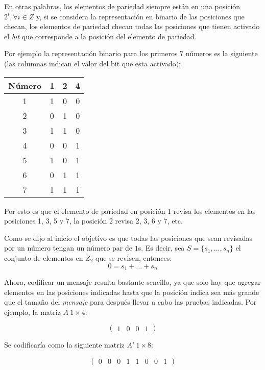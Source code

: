 \documentclass{article}
\begin{document}
En otras palabras, los elementos de pariedad siempre están en una posición $2^i, \forall i \in Z$ y, si se considera la representación en binario de las posiciones que checan, los elementos de pariedad checan todas las posiciones que tienen activado el \textit{bit} que corresponde a la posición del elemento de pariedad.

Por ejemplo la representación binario para los primeros 7 números es la siguiente (las columnas indican el valor del bit que esta activado):

\begin{center}
    \begin{tabular}{|c||c|c|c|}
        \hline
        Número & 1 & 2 & 4 \\
        \hline
        1 & 1 & 0 & 0 \\
        2 & 0 & 1 & 0 \\
        3 & 1 & 1 & 0 \\
        4 & 0 & 0 & 1 \\
        5 & 1 & 0 & 1 \\
        6 & 0 & 1 & 1 \\
        7 & 1 & 1 & 1 \\
        \hline
    \end{tabular}
\end{center}

Por esto es que el elemento de pariedad en posición 1 revisa los elementos en las posiciones 1, 3, 5 y 7, la posición 2 revisa 2, 3, 6 y 7, etc. 

Como se dijo al inicio el objetivo es que todas las posiciones que sean revisadas por un número tengan un número par de $1$s. Es decir, sea $S = \{ s_1, ..., s_n \}$ el conjunto de elementos en $Z_2$ que se revisen, entonces:
$$
0 = s_1 + ... + s_n
$$

Ahora, codificar un mensaje resulta bastante sencillo, ya que solo hay que agregar elementos en las posiciones indicadas hasta que la posición indica sea más grande que el tamaño del \textit{mensaje} para después llevar a cabo las pruebas indicadas. Por ejemplo, la matriz $A\ 1 \times 4$:

$$
\begin{pmatrix}
    1 & 0 & 0 & 1
\end{pmatrix}
$$

Se codificaría como la siguiente matriz $A'\ 1 \times 8$:

$$
\begin{pmatrix}
    0 & 0 & 0 & 1 & 1 & 0 & 0 & 1
\end{pmatrix}
$$
\end{document}
